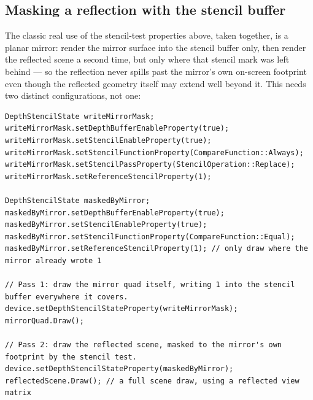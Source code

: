 \subsection{Masking a reflection with the stencil buffer}

The classic real use of the stencil-test properties above, taken together, is a planar mirror:
render the mirror surface into the stencil buffer only, then render the reflected scene a
second time, but only where that stencil mark was left behind --- so the reflection never
spills past the mirror's own on-screen footprint even though the reflected geometry itself may
extend well beyond it. This needs two distinct  configurations, not
one:

\begin{lstlisting}
DepthStencilState writeMirrorMask;
writeMirrorMask.setDepthBufferEnableProperty(true);
writeMirrorMask.setStencilEnableProperty(true);
writeMirrorMask.setStencilFunctionProperty(CompareFunction::Always);
writeMirrorMask.setStencilPassProperty(StencilOperation::Replace);
writeMirrorMask.setReferenceStencilProperty(1);

DepthStencilState maskedByMirror;
maskedByMirror.setDepthBufferEnableProperty(true);
maskedByMirror.setStencilEnableProperty(true);
maskedByMirror.setStencilFunctionProperty(CompareFunction::Equal);
maskedByMirror.setReferenceStencilProperty(1); // only draw where the mirror already wrote 1

// Pass 1: draw the mirror quad itself, writing 1 into the stencil buffer everywhere it covers.
device.setDepthStencilStateProperty(writeMirrorMask);
mirrorQuad.Draw();

// Pass 2: draw the reflected scene, masked to the mirror's own footprint by the stencil test.
device.setDepthStencilStateProperty(maskedByMirror);
reflectedScene.Draw(); // a full scene draw, using a reflected view matrix
\end{lstlisting}

